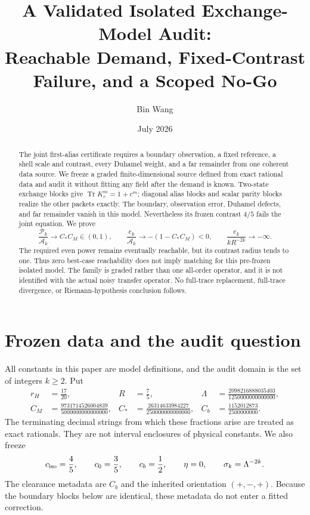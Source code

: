 \documentclass[11pt]{article}
\title{A Validated Isolated Exchange-Model Audit:\\
Reachable Demand, Fixed-Contrast Failure, and a Scoped No-Go}
\author{Bin Wang}
\date{July 2026}
\theoremstyle{remark}
\newcommand{\Tr}{\operatorname{Tr}}
\newcommand{\cA}{\mathcal A}
\newcommand{\cP}{\mathcal P}
\begin{document}
\maketitle

\begin{abstract}
The joint first-alias certificate requires a boundary observation, a fixed
reference, a shell scale and contrast, every Duhamel weight, and a far
remainder from one coherent data source.  We freeze a graded
finite-dimensional source defined from exact rational data and audit it
without fitting any field after the demand is known.  Two-state exchange
blocks give
$\Tr K_c^m=1+c^m$; diagonal alias blocks and scalar parity blocks realize the
other packets exactly.  The boundary, observation error, Duhamel defects,
and far remainder vanish in this model.  Nevertheless its frozen contrast
$4/5$ fails the joint equation.  We prove
\[
 \frac{\cP_k}{\cA_k}\longrightarrow C_*C_M\in(0,1),\qquad
 \frac{e_k}{\cA_k}\longrightarrow-(1-C_*C_M)<0,
 \qquad \frac{e_k}{kR^{-2k}}\longrightarrow-\infty.
\]
The required even power remains eventually reachable, but its contrast
radius tends to one.  Thus zero best-case reachability does not imply
matching for this pre-frozen isolated model.  The family is graded rather
than one all-order operator, and it is not identified with the actual noisy
transfer operator.  No full-trace replacement, full-trace divergence, or
Riemann-hypothesis conclusion follows.
\end{abstract}

\section{Frozen data and the audit question}

All constants in this paper are model definitions, and the audit domain is
the set of integers $k\ge2$.  Put
\begin{align}
 r_H&=\frac{17}{20},& R&=\frac75,
 &\Lambda&=\frac{2098216888035403}{1250000000000000},
 \label{eq:radii}\\
 C_M&=\frac{9731714526004839}{5000000000000000},
 &C_*&=\frac{26314633984227}{250000000000000},
 &C_b&=\frac{1152012873}{2500000000}.
 \label{eq:constants}
\end{align}
The terminating decimal strings from which these fractions arise are
treated as exact rationals.  They are not interval enclosures of physical
constants.  We also freeze
\begin{equation}
 c_{\rm iso}=\frac45,
 \qquad c_0=\frac35,
 \qquad c_b=\frac12,
 \qquad \eta=0,
 \qquad \sigma_k=\Lambda^{-2k}.
 \label{eq:frozen-contrasts}
\end{equation}
The clearance metadata are $C_b$ and the inherited orientation
$(+,-,+)$.  Because the boundary blocks below are identical, these metadata
do not enter a fitted correction.
\end{document}
